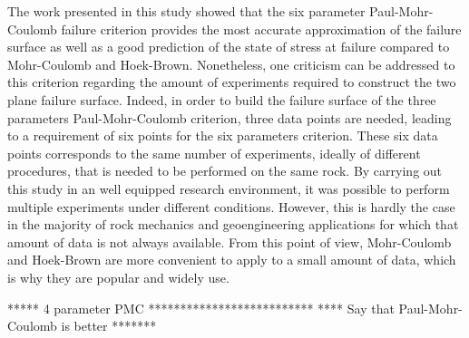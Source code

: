 The work presented in this study showed that the six parameter Paul-Mohr-Coulomb failure criterion provides the most accurate approximation of the failure surface as well as a good prediction of the state of stress at failure compared to Mohr-Coulomb and Hoek-Brown. Nonetheless, one criticism can be addressed to this criterion regarding the amount of experiments required to construct the two plane failure surface. Indeed, in order to build the failure surface of the three parameters Paul-Mohr-Coulomb criterion, three data points are needed, leading to a requirement of six points for the six parameters criterion. These six data points corresponds to the same number of experiments, ideally of different procedures, that is needed to be performed on the same rock. By carrying out this study in an well equipped research environment, it was possible to perform multiple experiments under different conditions. However, this is hardly the case in the majority of rock mechanics and geoengineering applications for which that amount of data is not always available. From this point of view, Mohr-Coulomb and Hoek-Brown are more convenient to apply to a small amount of data, which is why they are popular and widely use. 

***** 4 parameter PMC **************************
**** Say that Paul-Mohr-Coulomb is better *******


